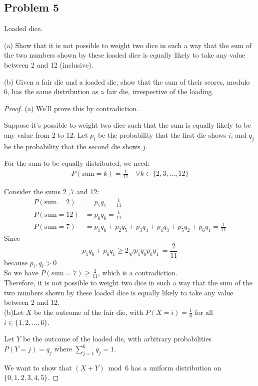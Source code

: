\documentclass[letterpaper, 11pt]{article}
\newcommand{\1}{\mathds{1}}	%
\theoremstyle{definition}
\begin{document}
\subsection*{Problem 5}
Loaded dice.

(a) Show that it is not possible to weight two dice in such a way that the sum of the two numbers shown by these loaded dice is equally likely to take any value between 2 and 12 (inclusive).

(b) Given a fair die and a loaded die, show that the sum of their scores, modulo 6, has the same distribution as a fair die, irrespective of the loading.
\begin{proof}
(a) We'll prove this by contradiction.

Suppose it's possible to weight two dice such that the sum is equally likely to be any value from 2 to 12. Let $p_i$ be the probability that the first die shows $i$, and $q_j$ be the probability that the second die shows $j$.

For the sum to be equally distributed, we need:
\begin{align*}
P(\text{sum} = k) = \frac{1}{11} \quad \forall k \in \{2,3,\ldots,12\}
\end{align*}

Consider the sums 2 ,7 and 12:
\begin{align*}
P(\text{sum} = 2) &= p_1q_1 = \frac{1}{11}\\
P(\text{sum} = 12) &= p_6q_6 = \frac{1}{11}\\
P(\text{sum} = 7) &= p_1q_6 + p_2q_5 + p_3q_4 + p_4q_3 + p_5q_2 + p_6q_1 = \frac{1}{11}\end{align*}
Since  $$p_1q_6+ p_6q_1 \geq 2\sqrt{p_1q_6 p_6q_1 } = \frac{2}{11}$$ because $ p_i,q_i>0 $ \\
 $\text{So we have  } P(\text{sum} = 7) \geq \frac{2}{11} $, which is a contradiction. 
 \\Therefore, it is not possible to weight two dice in such a way that the sum of the two numbers shown by these loaded dice is equally likely to take any value between 2 and 12.
\\(b)Let $X$ be the outcome of the fair die, with $P(X=i) = \frac{1}{6}$ for all $i \in \{1,2,\ldots,6\}$.

Let $Y$ be the outcome of the loaded die, with arbitrary probabilities $P(Y=j) = q_j$ where $\sum_{j=1}^6 q_j = 1$.

We want to show that $(X+Y) \bmod 6$ has a uniform distribution on $\{0,1,2,3,4,5\}$.


\end{proof}
\end{document}
